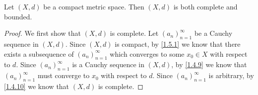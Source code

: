 \begin{prop}\label{1.5.5}
  Let \((X, d)\) be a compact metric space.
  Then \((X, d)\) is both complete and bounded.
\end{prop}

\begin{proof}
  We first show that \((X, d)\) is complete.
  Let \((a_n)_{n = 1}^\infty\) be a Cauchy sequence in \((X, d)\).
  Since \((X, d)\) is compact, by \cref{1.5.1} we know that there exists a subsequence of \((a_n)_{n = 1}^\infty\) which converges to some \(x_0 \in X\) with respect to \(d\).
  Since \((a_n)_{n = 1}^\infty\) is a Cauchy sequence in \((X, d)\), by \cref{1.4.9} we know that \((a_n)_{n = 1}^\infty\) must converge to \(x_0\) with respect to \(d\).
  Since \((a_n)_{n = 1}^\infty\) is arbitrary, by \cref{1.4.10} we know that \((X, d)\) is complete.


\end{proof}
